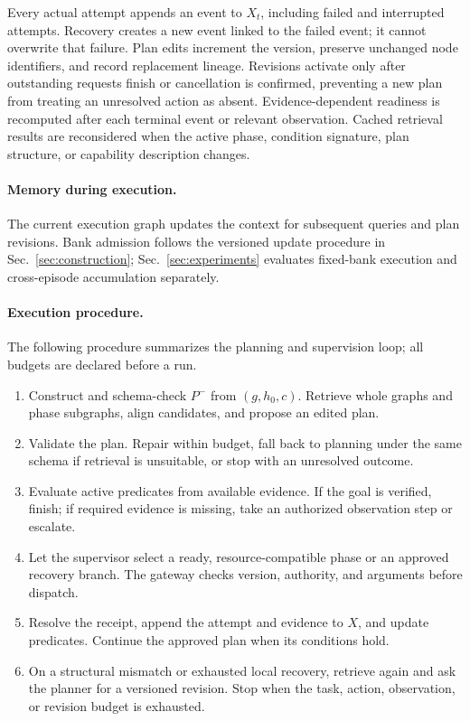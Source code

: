 Every actual attempt appends an event to $X_t$, including failed and interrupted attempts. Recovery creates a new event linked to the failed event; it cannot overwrite that failure. Plan edits increment the version, preserve unchanged node identifiers, and record replacement lineage. Revisions activate only after outstanding requests finish or cancellation is confirmed, preventing a new plan from treating an unresolved action as absent. Evidence-dependent readiness is recomputed after each terminal event or relevant observation. Cached retrieval results are reconsidered when the active phase, condition signature, plan structure, or capability description changes.

\paragraph{Memory during execution.}
The current execution graph updates the context for subsequent queries and plan revisions. Bank admission follows the versioned update procedure in Sec.~\ref{sec:construction}; Sec.~\ref{sec:experiments} evaluates fixed-bank execution and cross-episode accumulation separately.

\paragraph{Execution procedure.}
The following procedure summarizes the planning and supervision loop; all budgets are declared before a run.
\begin{enumerate}
\item Construct and schema-check $P^{-}$ from $(g,h_0,c)$. Retrieve whole graphs and phase subgraphs, align candidates, and propose an edited plan.
\item Validate the plan. Repair within budget, fall back to planning under the same schema if retrieval is unsuitable, or stop with an unresolved outcome.
\item Evaluate active predicates from available evidence. If the goal is verified, finish; if required evidence is missing, take an authorized observation step or escalate.
\item Let the supervisor select a ready, resource-compatible phase or an approved recovery branch. The gateway checks version, authority, and arguments before dispatch.
\item Resolve the receipt, append the attempt and evidence to $X$, and update predicates. Continue the approved plan when its conditions hold.
\item On a structural mismatch or exhausted local recovery, retrieve again and ask the planner for a versioned revision. Stop when the task, action, observation, or revision budget is exhausted.
\end{enumerate}

